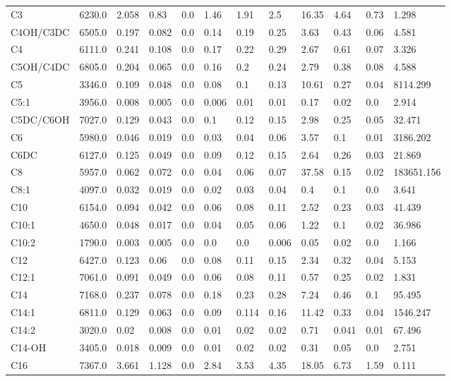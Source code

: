 \begin{tabular}{|l|l|l|l|l|l|l|l|l|l|l|l|}
C3 & 6230.0 & 2.058 & 0.83 & 0.0 & 1.46 & 1.91 & 2.5 & 16.35 & 4.64 & 0.73 & 1.298 \\
C4OH/C3DC & 6505.0 & 0.197 & 0.082 & 0.0 & 0.14 & 0.19 & 0.25 & 3.63 & 0.43 & 0.06 & 4.581 \\
C4 & 6111.0 & 0.241 & 0.108 & 0.0 & 0.17 & 0.22 & 0.29 & 2.67 & 0.61 & 0.07 & 3.326 \\
C5OH/C4DC & 6805.0 & 0.204 & 0.065 & 0.0 & 0.16 & 0.2 & 0.24 & 2.79 & 0.38 & 0.08 & 4.588 \\
C5 & 3346.0 & 0.109 & 0.048 & 0.0 & 0.08 & 0.1 & 0.13 & 10.61 & 0.27 & 0.04 & 8114.299 \\
C5:1 & 3956.0 & 0.008 & 0.005 & 0.0 & 0.006 & 0.01 & 0.01 & 0.17 & 0.02 & 0.0 & 2.914 \\
C5DC/C6OH & 7027.0 & 0.129 & 0.043 & 0.0 & 0.1 & 0.12 & 0.15 & 2.98 & 0.25 & 0.05 & 32.471 \\
C6 & 5980.0 & 0.046 & 0.019 & 0.0 & 0.03 & 0.04 & 0.06 & 3.57 & 0.1 & 0.01 & 3186.202 \\
C6DC & 6127.0 & 0.125 & 0.049 & 0.0 & 0.09 & 0.12 & 0.15 & 2.64 & 0.26 & 0.03 & 21.869 \\
C8 & 5957.0 & 0.062 & 0.072 & 0.0 & 0.04 & 0.06 & 0.07 & 37.58 & 0.15 & 0.02 & 183651.156 \\
C8:1 & 4097.0 & 0.032 & 0.019 & 0.0 & 0.02 & 0.03 & 0.04 & 0.4 & 0.1 & 0.0 & 3.641 \\
C10 & 6154.0 & 0.094 & 0.042 & 0.0 & 0.06 & 0.08 & 0.11 & 2.52 & 0.23 & 0.03 & 41.439 \\
C10:1 & 4650.0 & 0.048 & 0.017 & 0.0 & 0.04 & 0.05 & 0.06 & 1.22 & 0.1 & 0.02 & 36.986 \\
C10:2 & 1790.0 & 0.003 & 0.005 & 0.0 & 0.0 & 0.0 & 0.006 & 0.05 & 0.02 & 0.0 & 1.166 \\
C12 & 6427.0 & 0.123 & 0.06 & 0.0 & 0.08 & 0.11 & 0.15 & 2.34 & 0.32 & 0.04 & 5.153 \\
C12:1 & 7061.0 & 0.091 & 0.049 & 0.0 & 0.06 & 0.08 & 0.11 & 0.57 & 0.25 & 0.02 & 1.831 \\
C14 & 7168.0 & 0.237 & 0.078 & 0.0 & 0.18 & 0.23 & 0.28 & 7.24 & 0.46 & 0.1 & 95.495 \\
C14:1 & 6811.0 & 0.129 & 0.063 & 0.0 & 0.09 & 0.114 & 0.16 & 11.42 & 0.33 & 0.04 & 1546.247 \\
C14:2 & 3020.0 & 0.02 & 0.008 & 0.0 & 0.01 & 0.02 & 0.02 & 0.71 & 0.041 & 0.01 & 67.496 \\
C14-OH & 3405.0 & 0.018 & 0.009 & 0.0 & 0.01 & 0.02 & 0.02 & 0.31 & 0.05 & 0.0 & 2.751 \\
C16 & 7367.0 & 3.661 & 1.128 & 0.0 & 2.84 & 3.53 & 4.35 & 18.05 & 6.73 & 1.59 & 0.111 \\

\end{tabular}
